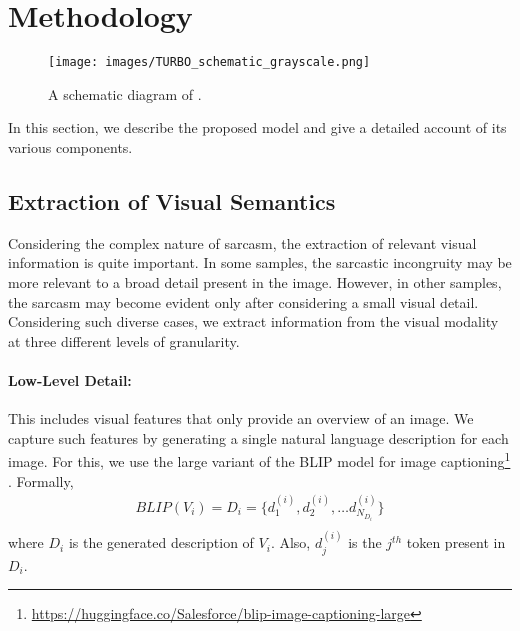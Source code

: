 \section{Methodology}\label{sec:method}

\begin{figure*}[t]
  \texttt{[image: images/TURBO\_schematic\_grayscale.png]}
  \caption{A schematic diagram of \model.}
  \label{fig:CASH}
\end{figure*}

In this section, we describe the proposed model and give a detailed account of its various components.%

\subsection{Extraction of Visual Semantics} \label{sec:visual-semantics-extraction}
Considering the complex nature of sarcasm, the extraction of relevant visual information is quite important. 
In some samples, the sarcastic incongruity may be more relevant to a broad detail present in the image. However, in other samples, the sarcasm may become evident only after considering a small visual detail. Considering such diverse cases, we extract information from the visual modality at three different levels of granularity. 

\paragraph{Low-Level Detail:} This includes visual features that only provide an overview of an image. We capture such features by generating a single natural language description for each image. For this, we use the large variant of the BLIP model for image captioning\footnote{\url{https://huggingface.co/Salesforce/blip-image-captioning-large}} \citep{li2022blip}. Formally,
\begin{equation}
    \label{eq: coarse-grained-semantics}
    \begin{aligned}
        BLIP(V_i) = D_i = \{d_1^{(i)}, d_2^{(i)}, \dots d_{N_{D_i}}^{(i)}\}\\
    \end{aligned}
\end{equation}
where $D_i$ is the generated description of $V_i$. Also, $d_j^{(i)}$ is the $j^{th}$ token present in $D_i$.
        

